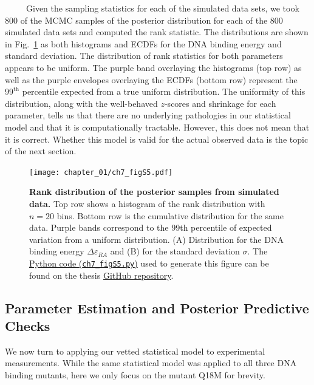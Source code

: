 \documentclass[12pt]{caltech_thesis}
\begin{document}
~~~~~Given the sampling statistics for each of the simulated data sets,
we took 800 of the MCMC samples of the posterior distribution for each
of the 800 simulated data sets and computed the rank statistic. The
distributions are shown in Fig.~\ref{fig:epRA_sbc_rank} as both
histograms and ECDFs for the DNA binding energy and standard deviation.
The distribution of rank statistics for both parameters appears to be
uniform. The purple band overlaying the histograms (top row) as well as
the purple envelopes overlaying the ECDFs (bottom row) represent the
\(99^\text{th}\) percentile expected from a true uniform distribution.
The uniformity of this distribution, along with the well-behaved
\(z\)-scores and shrinkage for each parameter, tells us that there are
no underlying pathologies in our statistical model and that it is
computationally tractable. However, this does not mean that it is
correct. Whether this model is valid for the actual observed data is the
topic of the next section.

\hypertarget{fig:epRA_sbc_rank}{%
\begin{figure}
\centering
\texttt{[image: chapter\_01/ch7\_figS5.pdf]}
\caption[{Rank distribution of the posterior samples from simulated data
for the DNA binding energy and homoscedastic error.}]{\textbf{Rank
distribution of the posterior samples from simulated data.} Top row
shows a histogram of the rank distribution with \(n=20\) bins. Bottom
row is the cumulative distribution for the same data. Purple bands
correspond to the 99th percentile of expected variation from a uniform
distribution. (A) Distribution for the DNA binding energy
\(\Delta\varepsilon_{RA}\) and (B) for the standard deviation
\(\sigma\). The
\href{https://github.com/gchure/phd/blob/master/src/chapter_07/code/ch7_figS5.py}{Python
code (\texttt{ch7\_figS5.py})} used to generate this figure can be found
on the thesis \href{https://github.com/gchure/phd}{GitHub repository}.}
\label{fig:epRA_sbc_rank}
\end{figure}
}

\hypertarget{parameter-estimation-and-posterior-predictive-checks}{%
\subsection{Parameter Estimation and Posterior Predictive
Checks}\label{parameter-estimation-and-posterior-predictive-checks}}

We now turn to applying our vetted statistical model to experimental
measurements. While the same statistical model was applied to all three
DNA binding mutants, here we only focus on the mutant Q18M for brevity.
\end{document}

